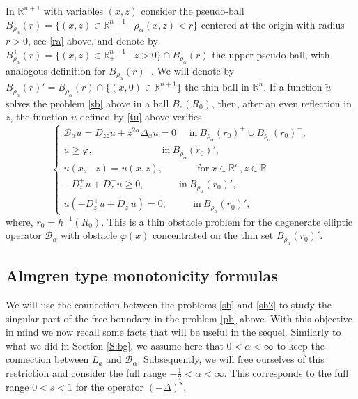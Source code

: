 \documentclass[11pt]{amsart}
\theoremstyle{plain}
\numberwithin{equation}{section}
\begin{document}
In ${\mathbb R}^{n+1}$ with variables $(x,z)$ consider the pseudo-ball $B_{\rho_\alpha}(r)  = \{(x,z)\in {\mathbb R}^{n+1}\mid \rho_\alpha(x,z) <r\}$ centered at the origin with radius $r>0$, see \eqref{ra} above, and denote by $B_{\rho_\alpha}^+(r) = \{(x,z)\in {{\mathbb R}^{n+1}_+} \mid z>0\}\cap B_{\rho_\alpha}(r)$ the upper pseudo-ball, with analogous definition for $B_{\rho_\alpha}(r)^-$. We will denote by $B_{\rho_\alpha}(r)' = B_{\rho_\alpha}(r)\cap \{(x,0)\in {\mathbb R}^{n+1}\}$ the thin ball in ${\mathbb R^n}$. If a function $\tilde u$ solves the problem \eqref{sb} above in a ball $B_e(R_0)$, then, after an even reflection in $z$,
the function $u$ defined by \eqref{tu} above verifies
\begin{equation}\label{sb2}
\begin{cases}
{\mathcal{B}_\alpha} u = D_{zz} u + z^{2\alpha} \Delta_x u = 0\ \ \ \ \ \  \text{in}\ B_{\rho_\alpha}(r_0)^+ \cup B_{\rho_\alpha}(r_0)^-,
\\
u \ge {\varphi},\ \ \ \ \ \ \ \ \ \ \ \ \ \ \ \ \ \ \ \ \ \ \ \ \ \ \ \ \ \ \ \  \text{in}\ B_{\rho_\alpha}(r_0)',
\\
u(x,-z) = u(x,z),\ \ \ \ \ \ \ \ \ \ \ \ \ \ \ \ \text{for}\ x\in {\mathbb R^n}, z\in {\mathbb R}
\\
- D_z^+ u + D_z^- u  \ge 0, \ \ \ \ \ \ \ \ \ \ \ \ \ \ \ \ \text{in}\ B_{\rho_\alpha}(r_0)',
\\
u (- D_z^+ u + D_z^- u)= 0, \ \ \ \ \ \ \ \ \ \ \ \ \text{in}\ B_{\rho_\alpha}(r_0)',
\end{cases}
\end{equation}
where, $r_0 = h^{-1}(R_0)$. This is a thin obstacle  problem for the degenerate elliptic operator ${\mathcal{B}_\alpha}$ with obstacle ${\varphi}(x)$ concentrated on the thin set $B_{\rho_\alpha}(r_0)'$.

\subsection{Almgren type monotonicity formulas}\label{SS:almgren}
We will use the connection between the problems \eqref{sb} and \eqref{sb2} to study the singular part of the free boundary in the problem \eqref{pb} above. With this objective in mind we now recall some facts that will be useful in the sequel. Similarly to what we did in Section \ref{S:bg}, we assume here that $0<\alpha < \infty$ to keep the connection between $L_a$ and ${\mathcal{B}_\alpha}$. Subsequently, we will free ourselves of this restriction and consider the full range $-\frac 12 < \alpha < \infty$. This corresponds to the full range $0<s<1$ for the operator $(-\Delta)^s$.
\end{document}
